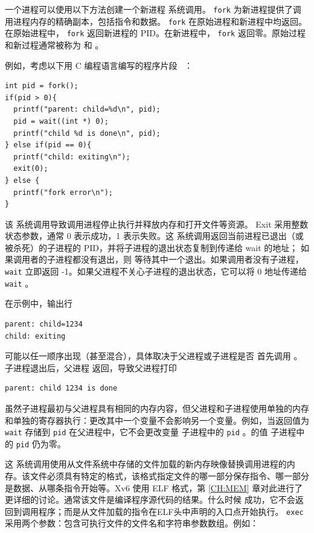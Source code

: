 一个进程可以使用以下方法创建一个新进程
        系统调用。
    \lstinline{fork}    为新进程提供了调用进程内存的精确副本，包括指令和数据。
    \lstinline{fork}    在原始进程和新进程中均返回。在原始进程中，   \lstinline{fork}    返回新进程的 PID。在新进程中，   \lstinline{fork}    返回零。原始过程和新过程通常被称为
        和
        。  

例如，考虑以下用 C 编程语言编写的程序片段 ~\cite{kernighan}：
\begin{lstlisting}[]
int pid = fork();
if(pid > 0){
  printf("parent: child=%d\n", pid);
  pid = wait((int *) 0);
  printf("child %d is done\n", pid);
} else if(pid == 0){
  printf("child: exiting\n");
  exit(0);
} else {
  printf("fork error\n");
}
\end{lstlisting}    该
        系统调用导致调用进程停止执行并释放内存和打开文件等资源。 Exit 采用整数状态参数，通常 0 表示成功，1 表示失败。这
        系统调用返回当前进程已退出（或被杀死）的子进程的 PID，并将子进程的退出状态复制到传递给 wait 的地址； 如果调用者的子进程都没有退出，则   等待其中一个退出。如果调用者没有子进程，   \lstinline{wait}    立即返回 -1。如果父进程不关心子进程的退出状态，它可以将 0 地址传递给
    \lstinline{wait}    。  

在示例中，输出行

\begin{lstlisting}[]
parent: child=1234
child: exiting
\end{lstlisting}  
	  
	可能以任一顺序出现（甚至混合），具体取决于父进程或子进程是否
 首先调用       。子进程退出后，父进程
        返回，导致父进程打印
    
\begin{lstlisting}[]
parent: child 1234 is done
\end{lstlisting} 
	
	虽然子进程最初与父进程具有相同的内存内容，但父进程和子进程使用单独的内存和单独的寄存器执行：更改其中一个变量不会影响另一个变量。例如，当返回值为
    \lstinline{wait}    存储到
    \lstinline{pid}    在父进程中，它不会更改变量
 子进程中的    \lstinline{pid}   。的值
 子进程中的    \lstinline{pid}    仍为零。  

这
        系统调用使用从文件系统中存储的文件加载的新内存映像替换调用进程的内存。该文件必须具有特定的格式，该格式指定文件的哪一部分保存指令、哪一部分是数据、从哪条指令开始等。Xv6 使用 ELF 格式，第    \ref{CH:MEM}    章对此进行了更详细的讨论。通常该文件是编译程序源代码的结果。什么时候
       成功，它不会返回到调用程序；而是从文件加载的指令在ELF头中声明的入口点开始执行。
    \lstinline{exec}    采用两个参数：包含可执行文件的文件名和字符串参数数组。例如：
   

